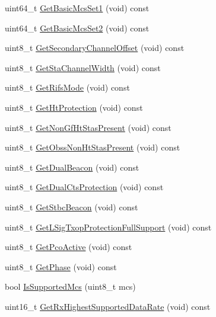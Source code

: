 \begin{DoxyCompactItemize}
\item 
uint64\+\_\+t \hyperlink{classns3_1_1HtOperation_a6a78fa0ad6c74768ce8d197da00bf639}{Get\+Basic\+Mcs\+Set1} (void) const 
\item 
uint64\+\_\+t \hyperlink{classns3_1_1HtOperation_a021384b6e800c787022e5f2c14b7bd5d}{Get\+Basic\+Mcs\+Set2} (void) const 
\item 
uint8\+\_\+t \hyperlink{classns3_1_1HtOperation_a02ea9df038745ea83ea6d5212b70a34b}{Get\+Secondary\+Channel\+Offset} (void) const 
\item 
uint8\+\_\+t \hyperlink{classns3_1_1HtOperation_a50d319d943307aeebf8e3c96327ecf4d}{Get\+Sta\+Channel\+Width} (void) const 
\item 
uint8\+\_\+t \hyperlink{classns3_1_1HtOperation_a80a6597df09e0b75906c10bfde7741fd}{Get\+Rifs\+Mode} (void) const 
\item 
uint8\+\_\+t \hyperlink{classns3_1_1HtOperation_a583ec6313f0a2439c8e19fbb944f8a38}{Get\+Ht\+Protection} (void) const 
\item 
uint8\+\_\+t \hyperlink{classns3_1_1HtOperation_a0fc626f5bd75bfb8bed2c74dd314e990}{Get\+Non\+Gf\+Ht\+Stas\+Present} (void) const 
\item 
uint8\+\_\+t \hyperlink{classns3_1_1HtOperation_acc4b7cb242264be0094dd1163022adbe}{Get\+Obss\+Non\+Ht\+Stas\+Present} (void) const 
\item 
uint8\+\_\+t \hyperlink{classns3_1_1HtOperation_a4115fbace7fe69f265dc1fbc512fc60f}{Get\+Dual\+Beacon} (void) const 
\item 
uint8\+\_\+t \hyperlink{classns3_1_1HtOperation_a5cea7114fe3e2c8b528b9ee7551a5e14}{Get\+Dual\+Cts\+Protection} (void) const 
\item 
uint8\+\_\+t \hyperlink{classns3_1_1HtOperation_aad61a27eb92ffd946b9b12572a6dc443}{Get\+Stbc\+Beacon} (void) const 
\item 
uint8\+\_\+t \hyperlink{classns3_1_1HtOperation_a31f407eb23def2ca4d6df875d5614cf8}{Get\+L\+Sig\+Txop\+Protection\+Full\+Support} (void) const 
\item 
uint8\+\_\+t \hyperlink{classns3_1_1HtOperation_ad9cdabe6ff6c492a546d58db44b55811}{Get\+Pco\+Active} (void) const 
\item 
uint8\+\_\+t \hyperlink{classns3_1_1HtOperation_ad277da1bd4e4a163f4389b0255a69391}{Get\+Phase} (void) const 
\item 
bool \hyperlink{classns3_1_1HtOperation_ac94e4b4593e283b4cbd27ce8b76dc68d}{Is\+Supported\+Mcs} (uint8\+\_\+t mcs)
\item 
uint16\+\_\+t \hyperlink{classns3_1_1HtOperation_ae3d15270db9889cde00a8a810aa6d24d}{Get\+Rx\+Highest\+Supported\+Data\+Rate} (void) const 

\end{DoxyCompactItemize}
